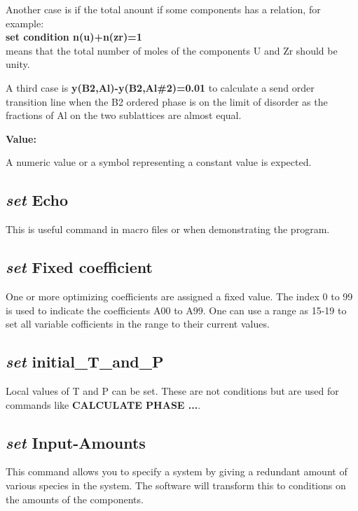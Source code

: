 \documentclass[11pt]{article}
\begin{document}
Another case is if the total anount if some components has a relation,
for example:\\ 
{\bf set condition n(u)+n(zr)=1}\\ 
means that the total number of moles of the components U and Zr should
be unity.

A third case is {\bf y(B2,Al)-y(B2,Al\#2)=0.01} to calculate a send
order transition line when the B2 ordered phase is on the limit of
disorder as the fractions of Al on the two sublattices are almost
equal.

{\bf Value:}

A numeric value or a symbol representing a constant value is expected.

\hypertarget{Set echo}{}
\subsection{{\em set} Echo}

This is useful command in macro files or when demonstrating the program.

\hypertarget{Set fix coeff}{}
\subsection{{\em set} Fixed coefficient}

One or more optimizing coefficients are assigned a fixed value.  The
index 0 to 99 is used to indicate the coefficients A00 to A99.  One
can use a range as 15-19 to set all variable cofficients in the range
to their current values.

\hypertarget{Set initial TP}{}
\subsection{{\em set} initial\_T\_and\_P}

Local values of T and P can be set.  These are not conditions but are
used for commands like {\bf CALCULATE PHASE ...}.

\hypertarget{Set input amounts}{}
\subsection{{\em set} Input-Amounts}\label{sc:setinpuam}

This command allows you to specify a system by giving a redundant
amount of various species in the system.  The software will transform
this to conditions on the amounts of the components.
\end{document}
